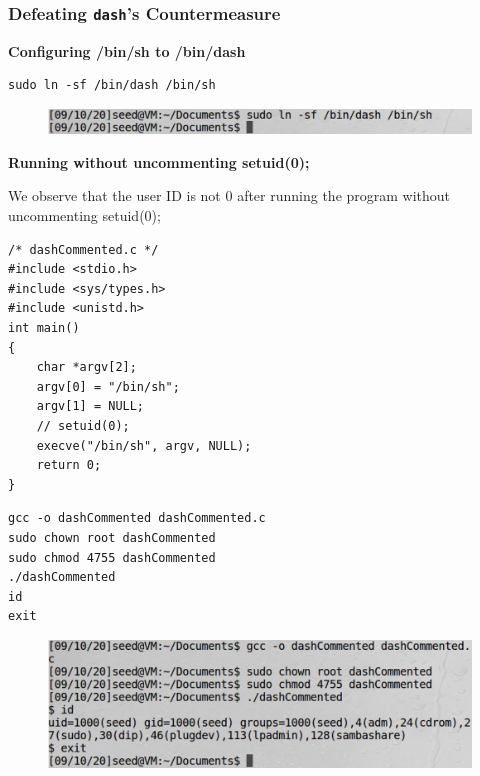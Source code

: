 \documentclass[12pt]{article}
\begin{document}
\newpage

\subsubsection{Defeating \texttt{dash}’s Countermeasure}

\vspace{0.5in}

\begin{center}
    \textbf{Configuring /bin/sh to /bin/dash}
\end{center}

\begin{framed}
    \begin{verbatim}
sudo ln -sf /bin/dash /bin/sh
    \end{verbatim}
\end{framed}

\begin{figure}[H]
    \centering
    \includegraphics[width=1\textwidth]{bf-bin-dash.png}
\end{figure}



\newpage

\begin{center}
    \textbf{Running without uncommenting setuid(0);}
\end{center}

\noindent
We observe that the user ID is not 0 after running the program
without uncommenting setuid(0);

\begin{lstlisting}
/* dashCommented.c */
#include <stdio.h>
#include <sys/types.h>
#include <unistd.h>
int main()
{
    char *argv[2];
    argv[0] = "/bin/sh";
    argv[1] = NULL;
    // setuid(0);
    execve("/bin/sh", argv, NULL);
    return 0;
}
\end{lstlisting}

\begin{framed}
    \begin{verbatim}
gcc -o dashCommented dashCommented.c
sudo chown root dashCommented
sudo chmod 4755 dashCommented
./dashCommented
id
exit
    \end{verbatim}
\end{framed}

\begin{figure}[H]
    \centering
    \includegraphics[width=1\textwidth]{bf-dash-commented.png}
\end{figure}
\end{document}
